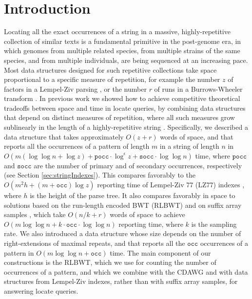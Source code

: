 \documentclass[a4paper,UKenglish]{lipics-v2016}
\begin{document}
\section{Introduction}\label{sec:introduction}

Locating all the exact occurrences of a string in a massive, highly-repetitive collection of similar texts is a fundamental primitive in the post-genome era, in which genomes from multiple related species, from multiple strains of the same species, and from multiple individuals, are being sequenced at an increasing pace. Most data structures designed for such repetitive collections take space proportional to a specific measure of repetition, for example the number $z$ of factors in a Lempel-Ziv parsing \cite{arroyuelo2012stronger,kreft2013compressing}, or the number $r$ of runs in a Burrows-Wheeler transform \cite{MakinenNSV10}. In previous work we showed how to achieve competitive theoretical tradeoffs between space and time in locate queries, by combining data structures that depend on distinct measures of repetition, where all such measures grow sublinearly in the length of a highly-repetitive string \cite{belazzougui2015composite}. Specifically, we described a data structure that takes approximately $O(z+r)$ words of space, and that reports all the occurrences of a pattern of length $m$ in a string of length $n$ in $O(m(\log{\log{n}} + \log{z}) + \mathtt{pocc} \cdot \log^{\epsilon}{z} + \mathtt{socc} \cdot \log{\log{n}})$ time, where $\mathtt{pocc}$ and $\mathtt{socc}$ are the number of primary and of secondary occurrences, respectively (see Section \ref{sec:stringIndexes}). This compares favorably to the $O(m^{2}h+(m+\mathtt{occ})\log{z})$ reporting time of Lempel-Ziv 77 (LZ77) indexes \cite{kreft2013compressing}, where $h$ is the height of the parse tree. It also compares favorably in space to solutions based on the run-length encoded BWT (RLBWT) and on suffix array samples
\cite{MakinenNSV10}, which take $O(n/k + r)$ words of space to achieve
$O(m\log{\log{n}} + k \cdot \mathtt{occ} \cdot \log{\log{n}})$ reporting
time, where $k$ is the sampling rate. We also introduced a data structure whose size depends on the number of right-extensions of maximal repeats, and that reports all the $\mathtt{occ}$ occurrences of a pattern in $O(m\log{\log{n}} + \mathtt{occ})$ time. The main component of our constructions is the RLBWT, which we use for counting the number of occurrences of a pattern, and which we combine with the CDAWG and with data structures from Lempel-Ziv indexes, rather than with suffix array samples, for answering locate queries.
\end{document}
